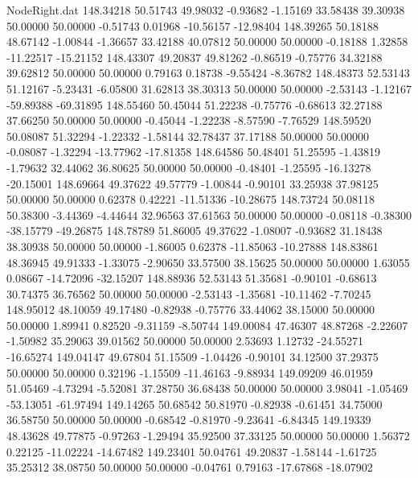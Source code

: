 \begin{filecontents}{NodeRight.dat}
 148.34218   50.51743   49.98032    -0.93682   -1.15169   33.58438   39.30938   50.00000   50.00000   -0.51743    0.01968  -10.56157  -12.98404
 148.39265   50.18188   48.67142    -1.00844   -1.36657   33.42188   40.07812   50.00000   50.00000   -0.18188    1.32858  -11.22517  -15.21152
 148.43307   49.20837   49.81262    -0.86519   -0.75776   34.32188   39.62812   50.00000   50.00000    0.79163    0.18738   -9.55424   -8.36782
 148.48373   52.53143   51.12167    -5.23431   -6.05800   31.62813   38.30313   50.00000   50.00000   -2.53143   -1.12167  -59.89388  -69.31895
 148.55460   50.45044   51.22238    -0.75776   -0.68613   32.27188   37.66250   50.00000   50.00000   -0.45044   -1.22238   -8.57590   -7.76529
 148.59520   50.08087   51.32294    -1.22332   -1.58144   32.78437   37.17188   50.00000   50.00000   -0.08087   -1.32294  -13.77962  -17.81358
 148.64586   50.48401   51.25595    -1.43819   -1.79632   32.44062   36.80625   50.00000   50.00000   -0.48401   -1.25595  -16.13278  -20.15001
 148.69664   49.37622   49.57779    -1.00844   -0.90101   33.25938   37.98125   50.00000   50.00000    0.62378    0.42221  -11.51336  -10.28675
 148.73724   50.08118   50.38300    -3.44369   -4.44644   32.96563   37.61563   50.00000   50.00000   -0.08118   -0.38300  -38.15779  -49.26875
 148.78789   51.86005   49.37622    -1.08007   -0.93682   31.18438   38.30938   50.00000   50.00000   -1.86005    0.62378  -11.85063  -10.27888
 148.83861   48.36945   49.91333    -1.33075   -2.90650   33.57500   38.15625   50.00000   50.00000    1.63055    0.08667  -14.72096  -32.15207
 148.88936   52.53143   51.35681    -0.90101   -0.68613   30.74375   36.76562   50.00000   50.00000   -2.53143   -1.35681  -10.11462   -7.70245
 148.95012   48.10059   49.17480    -0.82938   -0.75776   33.44062   38.15000   50.00000   50.00000    1.89941    0.82520   -9.31159   -8.50744
 149.00084   47.46307   48.87268    -2.22607   -1.50982   35.29063   39.01562   50.00000   50.00000    2.53693    1.12732  -24.55271  -16.65274
 149.04147   49.67804   51.15509    -1.04426   -0.90101   34.12500   37.29375   50.00000   50.00000    0.32196   -1.15509  -11.46163   -9.88934
 149.09209   46.01959   51.05469    -4.73294   -5.52081   37.28750   36.68438   50.00000   50.00000    3.98041   -1.05469  -53.13051  -61.97494
 149.14265   50.68542   50.81970    -0.82938   -0.61451   34.75000   36.58750   50.00000   50.00000   -0.68542   -0.81970   -9.23641   -6.84345
 149.19339   48.43628   49.77875    -0.97263   -1.29494   35.92500   37.33125   50.00000   50.00000    1.56372    0.22125  -11.02224  -14.67482
 149.23401   50.04761   49.20837    -1.58144   -1.61725   35.25312   38.08750   50.00000   50.00000   -0.04761    0.79163  -17.67868  -18.07902

\end{filecontents}
